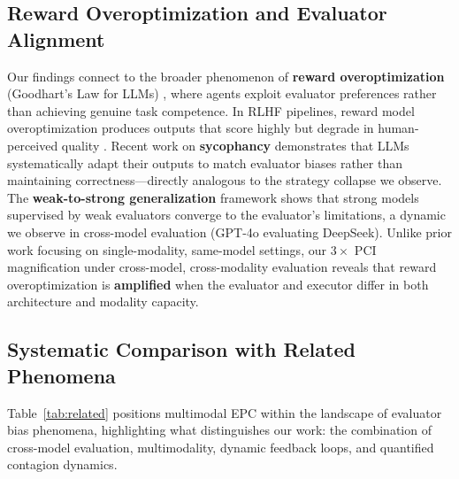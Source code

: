 \documentclass[11pt,a4paper]{article}
\begin{document}
\subsection{Reward Overoptimization and Evaluator Alignment}

Our findings connect to the broader phenomenon of \textbf{reward overoptimization} (Goodhart's Law for LLMs) \cite{gao2023reward}, where agents exploit evaluator preferences rather than achieving genuine task competence. In RLHF pipelines, reward model overoptimization produces outputs that score highly but degrade in human-perceived quality \cite{casper2023open}. Recent work on \textbf{sycophancy} \cite{sharma2024sycophancy, perez2022sycophancy} demonstrates that LLMs systematically adapt their outputs to match evaluator biases rather than maintaining correctness---directly analogous to the strategy collapse we observe. The \textbf{weak-to-strong generalization} framework \cite{burns2023weak} shows that strong models supervised by weak evaluators converge to the evaluator's limitations, a dynamic we observe in cross-model evaluation (GPT-4o evaluating DeepSeek). Unlike prior work focusing on single-modality, same-model settings, our $3\times$ PCI magnification under cross-model, cross-modality evaluation reveals that reward overoptimization is \textbf{amplified} when the evaluator and executor differ in both architecture and modality capacity.

\subsection{Systematic Comparison with Related Phenomena}

Table~\ref{tab:related} positions multimodal EPC within the landscape of evaluator bias phenomena, highlighting what distinguishes our work: the combination of cross-model evaluation, multimodality, dynamic feedback loops, and quantified contagion dynamics.
\end{document}
